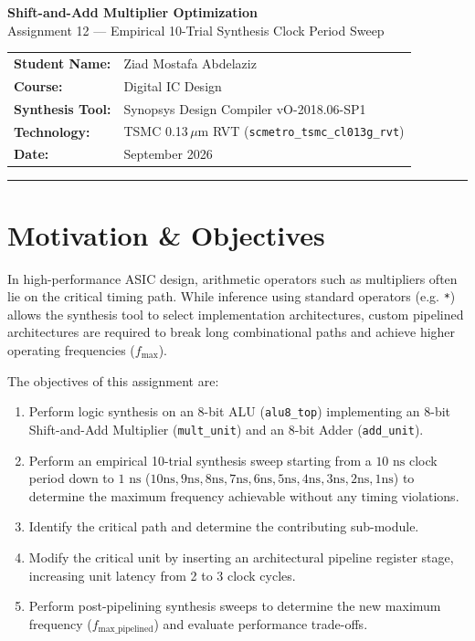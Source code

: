 \documentclass[12pt,a4paper]{article}
\begin{document}
\begin{titlepage}
\centering
\vspace*{1.5cm}
{\Huge\bfseries\color{headerblue} Shift-and-Add Multiplier Optimization\\[0.3em]}
{\Large\color{gray} Assignment 12 — Empirical 10-Trial Synthesis Clock Period Sweep\\[2.5cm]}

\begin{tabular}{ll}
\textbf{Student Name:} & Ziad Mostafa Abdelaziz \\[0.5em]
\textbf{Course:}       & Digital IC Design \\[0.5em]
\textbf{Synthesis Tool:}& Synopsys Design Compiler vO-2018.06-SP1 \\[0.5em]
\textbf{Technology:}& TSMC 0.13\,$\mu$m RVT (\texttt{scmetro\_tsmc\_cl013g\_rvt}) \\[0.5em]
\textbf{Date:}         & September 2026 \\
\end{tabular}

\vfill
\rule{\linewidth}{1pt}
\end{titlepage}

\tableofcontents
\newpage

\section{Motivation \& Objectives}

In high-performance ASIC design, arithmetic operators such as multipliers often lie on the critical timing path. While inference using standard operators (e.g. \texttt{*}) allows the synthesis tool to select implementation architectures, custom pipelined architectures are required to break long combinational paths and achieve higher operating frequencies ($f_{\text{max}}$).

The objectives of this assignment are:
\begin{enumerate}
  \item Perform logic synthesis on an 8-bit ALU (\texttt{alu8\_top}) implementing an 8-bit Shift-and-Add Multiplier (\texttt{mult\_unit}) and an 8-bit Adder (\texttt{add\_unit}).
  \item Perform an empirical 10-trial synthesis sweep starting from a $10\text{ ns}$ clock period down to $1\text{ ns}$ ($10\text{ns}, 9\text{ns}, 8\text{ns}, 7\text{ns}, 6\text{ns}, 5\text{ns}, 4\text{ns}, 3\text{ns}, 2\text{ns}, 1\text{ns}$) to determine the maximum frequency achievable without any timing violations.
  \item Identify the critical path and determine the contributing sub-module.
  \item Modify the critical unit by inserting an architectural pipeline register stage, increasing unit latency from 2 to 3 clock cycles.
  \item Perform post-pipelining synthesis sweeps to determine the new maximum frequency ($f_{\text{max\_pipelined}}$) and evaluate performance trade-offs.
\end{enumerate}
\end{document}
